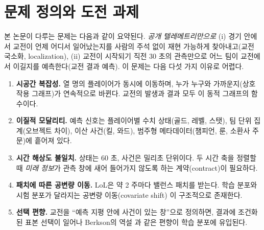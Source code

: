 
\section{문제 정의와 도전 과제}
\label{sec:intro-challenges}

본 논문이 다루는 문제는 다음과 같이 요약된다. \emph{공개 텔레메트리만으로} (i) 경기 안에서 교전이 언제 어디서 일어났는지를 사람의 주석 없이 재현 가능하게 찾아내고(교전 국소화, localization), (ii) 교전이 시작되기 직전 30 초의 관측만으로 어느 팀이 교전에서 이길지를 예측한다(교전 결과 예측). 이 문제는 다음 다섯 가지 이유로 어렵다.

\begin{enumerate}[leftmargin=2em]
  \item \textbf{시공간 복잡성.} 열 명의 플레이어가 동시에 이동하며, 누가 누구와 가까운지(상호작용 그래프)가 연속적으로 바뀐다. 교전의 발생과 결과 모두 이 동적 그래프의 함수이다.
  \item \textbf{이질적 모달리티.} 예측 신호는 플레이어별 수치 상태(골드, 레벨, 스탯), 팀 단위 집계(오브젝트 차이), 이산 사건(킬, 와드), 범주형 메타데이터(챔피언, 룬, 소환사 주문)에 흩어져 있다.
  \item \textbf{시간 해상도 불일치.} 상태는 60 초, 사건은 밀리초 단위이다. 두 시간 축을 정렬할 때 \emph{미래 정보}가 관측 창에 새어 들어가지 않도록 하는 계약(contract)이 필요하다.
  \item \textbf{패치에 따른 공변량 이동.} LoL은 약 2 주마다 밸런스 패치를 받는다. 학습 분포와 시험 분포가 달라지는 공변량 이동(covariate shift) \cite{shimodaira2000improving,quinonero2009dataset}이 구조적으로 존재한다.
  \item \textbf{선택 편향.} 교전을 ``예측 지평 안에 사건이 있는 창''으로 정의하면, 결과에 조건화된 표본 선택이 일어나 Berkson의 역설 \cite{berkson1946limitations}과 같은 편향이 학습 분포에 유입된다.
\end{enumerate}
